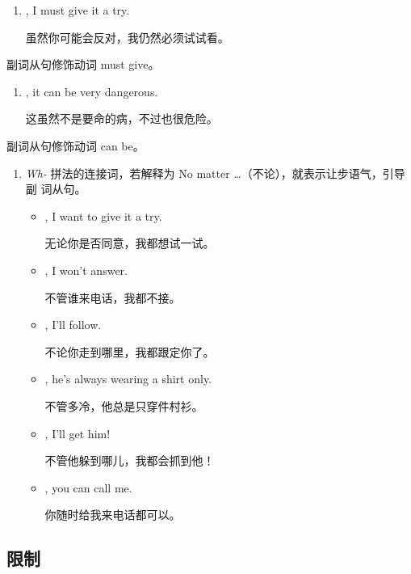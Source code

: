 \begin{enumerate}
\item {} , I must give it a
  try.

  虽然你可能会反对，我仍然必须试试看。
\end{enumerate}
副词从句修饰动词 must give。

\begin{enumerate}[resume]
\item {} , it can be
  very dangerous.

  这虽然不是要命的病，不过也很危险。
\end{enumerate}
副词从句修饰动词 can be。

\begin{enumerate}[resume]
\item \emph{Wh-} 拼法的连接词，若解释为 No matter \ldots（不论），就表示让步语气，引导副
  词从句。

\begin{itemize}
\item {} , I want
  to give it a try.

  无论你是否同意，我都想试一试。
\item {}, I won't answer.

  不管谁来电话，我都不接。
\item {}, I'll
  follow.

  不论你走到哪里，我都跟定你了。
\item {}, he's always
  wearing a shirt only.

  不管多冷，他总是只穿件村衫。
\item {}, I'll get
  him!

  不管他躲到哪儿，我都会抓到他！
\item {}, you can call me.

  你随时给我来电话都可以。
\end{itemize}
\end{enumerate}


\subsection{限制}

